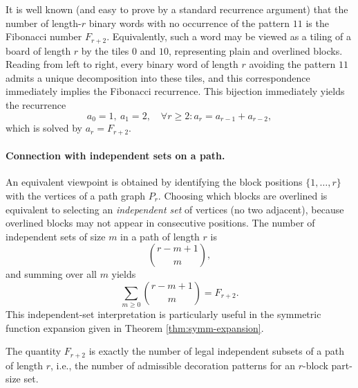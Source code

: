 \documentclass[letterpaper,12pt]{article}
\begin{document}
It is well known (and easy to prove by a standard recurrence argument) that the
number of length-\(r\) binary words with no occurrence of the pattern \(11\) is
the Fibonacci number \(F_{r+2}\). Equivalently, such a word may be viewed as a tiling of a board of length \(r\) by the tiles \(\boxed{0}\) and \(\boxed{10}\), representing plain and overlined blocks. Reading from left to right, every binary word of length \(r\) avoiding the pattern \(11\) admits a unique decomposition into these tiles, and this correspondence immediately implies the Fibonacci recurrence. This
bijection immediately yields the recurrence
\begin{equation}\label{eq:RecurenceFiboShifted}
    a_0 = 1,\ a_1 = 2,\quad \forall r\geq 2:a_r  =  a_{r-1} + a_{r-2},
\end{equation}
which is solved by \(a_r = F_{r+2}\).



\paragraph{Connection with independent sets on a path.}
An equivalent viewpoint is obtained by identifying the block positions
\(\{1,\ldots,r\}\) with the vertices of a path graph \(P_r\). Choosing which
blocks are overlined is equivalent to selecting an \emph{independent set} of
vertices (no two adjacent), because overlined blocks may not appear in
consecutive positions. The number of independent sets of size \(m\) in a path
of length \(r\) is
\[
\binom{r-m+1}{m},
\]
and summing over all \(m\) yields
\begin{equation}
    \sum_{m\ge0} \binom{r-m+1}{m} = F_{r+2}.
\end{equation}
This independent-set interpretation is particularly useful in the symmetric
function expansion given in Theorem \ref{thm:symm-expansion}.


The quantity \(F_{r+2}\) is exactly the number of legal independent subsets of a
path of length \(r\), i.e., the number of admissible decoration patterns for an
\(r\)-block part-size set.
\end{document}
